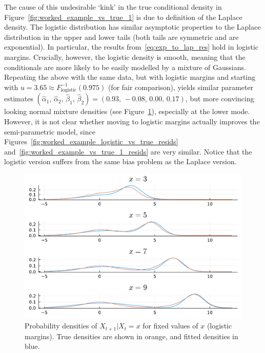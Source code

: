 \documentclass[11pt,twoside,openany]{book}
\numberwithin{Theorem}{chapter}
\numberwithin{Definition}{chapter}
\numberwithin{Lemma}{chapter}
\numberwithin{Algorithm}{chapter}
\numberwithin{equation}{chapter}
\begin{document}
The cause of this undesirable `kink' in the true conditional density
in Figure~\ref{fig:worked_example_vs_true_1} is
due to definition of the Laplace density. The logistic distribution has
similar asymptotic properties to the Laplace distribution in the upper and lower tails (both tails are symmetric and are exponential).
In particular, the
results from~\eqref{eq:exp_to_lap_res} hold in logistic margins.
Crucially, however, the logistic density is smooth, meaning that the conditionals
are more likely to be easily modelled by a mixture of Gaussians. Repeating the above with the same
data, but with logistic margins and starting with $u=3.65\approx
F_{\text{logistic}}^{-1}(0.975)$ (for fair comparison), yields
similar parameter estimates $(\hat\alpha_1,\,\hat\alpha_2,\,\hat\beta_1,\,\hat\beta_2)=(0.93,\,-0.08,\,0.00,\,0.17)$, but more convincing looking
normal mixture densities (see Figure~\ref{fig:worked_example_logistic_vs_true}),
especially at the lower mode. However, it is not clear whether moving to logistic
margins actually improves the semi-parametric model, since Figures~\ref{fig:worked_example_logistic_vs_true_resids} and~\ref{fig:worked_example_vs_true_1_resids} are very similar. Notice that the logistic version suffers from the same bias problem as the Laplace version.
\begin{figure}[htp]
  \centering
  \includegraphics[scale=0.7]{../ht-em/figures/worked_example_logistic_vs_true.pdf}
  \caption{Probability densities of $X_{t+1}|X_{t}=x$ for fixed values of $x$ (logistic margins).
    True densities are shown in orange, and fitted densities in blue.
   }\label{fig:worked_example_logistic_vs_true}
\end{figure}
\end{document}
